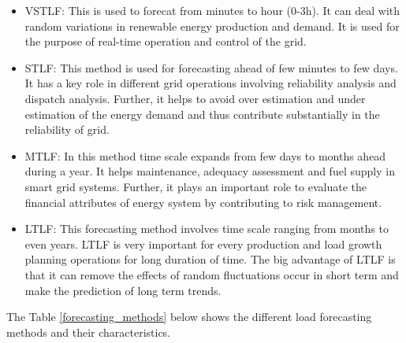 \documentclass[mstat,12pt]{unswthesis}
\begin{document}
\begin{itemize}
\item
  VSTLF: This is used to forecat from minutes to hour (0-3h). It can
  deal with random variations in renewable energy production and demand.
  It is used for the purpose of real-time operation and control of the
  grid.
\item
  STLF: This method is used for forecasting ahead of few minutes to few
  days. It has a key role in different grid operations involving
  reliability analysis and dispatch analysis. Further, it helps to avoid
  over estimation and under estimation of the energy demand and thus
  contribute substantially in the reliability of grid.
\item
  MTLF: In this method time scale expands from few days to months ahead
  during a year. It helps maintenance, adequacy assessment and fuel
  supply in smart grid systems. Further, it plays an important role to
  evaluate the financial attributes of energy system by contributing to
  risk management.
\item
  LTLF: This forecasting method involves time scale ranging from months
  to even years. LTLF is very important for every production and load
  growth planning operations for long duration of time. The big
  advantage of LTLF is that it can remove the effects of random
  fluctuations occur in short term and make the prediction of long term
  trends.
\end{itemize}

The Table \ref{forecasting_methods} \cite{9812604} below shows the
different load forecasting methods and their characteristics.

\begin{table}[h]
\caption{Forecasting methods}
\centering
{}
\label{forecasting_methods}
\end{table}
\end{document}
